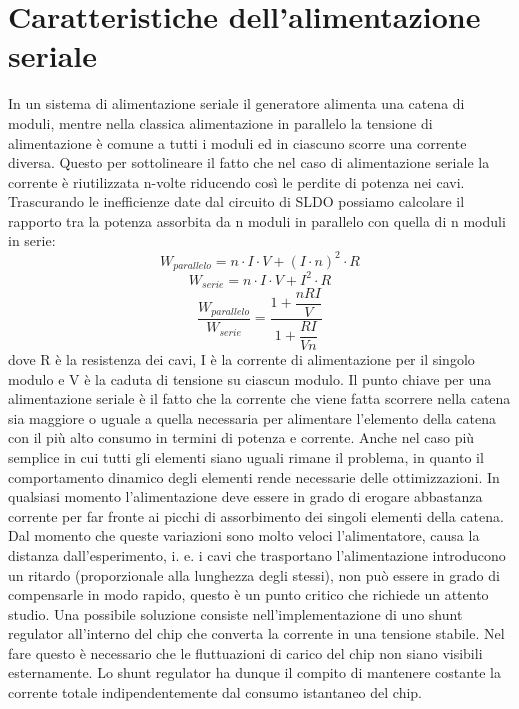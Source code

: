 \section{Caratteristiche dell'alimentazione seriale}
In un sistema di alimentazione seriale il generatore alimenta una catena di moduli, mentre nella classica alimentazione in parallelo la tensione di alimentazione è comune a tutti i moduli ed in ciascuno scorre una corrente diversa.
Questo per sottolineare il fatto che nel caso di alimentazione seriale la corrente è riutilizzata n-volte riducendo così le perdite di potenza nei cavi. 
Trascurando le inefficienze date dal circuito di SLDO possiamo calcolare il rapporto tra la potenza assorbita da n moduli in parallelo con quella di n moduli in serie:
\begin{equation}
W_{parallelo} = n \cdot I \cdot V + (I\cdot n)^2 \cdot R
\end{equation}
\begin{equation}
W_{serie} = n \cdot I \cdot V + I^2 \cdot R
\end{equation}
\begin{equation}
\frac{W_{parallelo}}{W_{serie}} = \frac{1+ \dfrac{nRI}{V}}{1+\dfrac{RI}{Vn}}
\end{equation}
dove R è la resistenza dei cavi, I è la corrente di alimentazione per il singolo modulo e V è la caduta di tensione su ciascun modulo. 
Il punto chiave per una alimentazione seriale è il fatto che la corrente che viene fatta scorrere nella catena sia maggiore o uguale a quella necessaria per alimentare l'elemento della catena con il più alto consumo in termini di potenza e corrente.
Anche nel caso più semplice in cui tutti gli elementi siano uguali rimane il problema, in quanto il comportamento dinamico degli elementi rende necessarie delle ottimizzazioni. 
In qualsiasi momento l'alimentazione deve essere in grado di erogare abbastanza corrente per far fronte ai picchi di assorbimento dei singoli elementi della catena. 
Dal momento che queste variazioni sono molto veloci l'alimentatore, causa la distanza dall'esperimento, i. e. i cavi che trasportano l'alimentazione introducono un ritardo (proporzionale alla lunghezza degli stessi),
non può essere in grado di compensarle in modo rapido, questo è un punto critico che richiede un attento studio. 
Una possibile soluzione consiste nell'implementazione di uno shunt regulator all'interno del chip che converta la corrente in una tensione stabile. 
Nel fare questo è necessario che le fluttuazioni di carico del chip non siano visibili esternamente. 
Lo shunt regulator ha dunque il compito di mantenere costante la corrente totale indipendentemente dal consumo istantaneo del chip.

